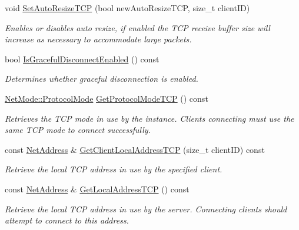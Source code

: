 \begin{DoxyCompactItemize}
void \hyperlink{class_net_instance_server_aff5d113ed49b9260903d50d832ea62dd}{SetAutoResizeTCP} (bool newAutoResizeTCP, size\_\-t clientID)
\begin{DoxyCompactList}\small\item\em Enables or disables auto resize, if enabled the TCP receive buffer size will increase as necessary to accommodate large packets. \item\end{DoxyCompactList}\item 
bool \hyperlink{class_net_instance_server_ad96584152bac1eae1103a98f90556fa4}{IsGracefulDisconnectEnabled} () const 
\begin{DoxyCompactList}\small\item\em Determines whether graceful disconnection is enabled. \item\end{DoxyCompactList}\item 
\hyperlink{class_net_mode_a43cfa55ee6a4db66a8d7d6c27f766964}{NetMode::ProtocolMode} \hyperlink{class_net_instance_server_a545676597d34fabc02a6d896d9c69d3d}{GetProtocolModeTCP} () const 
\begin{DoxyCompactList}\small\item\em Retrieves the TCP mode in use by the instance. Clients connecting must use the same TCP mode to connect successfully. \item\end{DoxyCompactList}\item 
const \hyperlink{class_net_address}{NetAddress} \& \hyperlink{class_net_instance_server_a360d85df2f48ca7964816bc95ed9ad98}{GetClientLocalAddressTCP} (size\_\-t clientID) const 
\begin{DoxyCompactList}\small\item\em Retrieve the local TCP address in use by the specified client. \item\end{DoxyCompactList}\item 
const \hyperlink{class_net_address}{NetAddress} \& \hyperlink{class_net_instance_server_ae1b6038671d198ce1f26da38661c397f}{GetLocalAddressTCP} () const 
\begin{DoxyCompactList}\small\item\em Retrieve the local TCP address in use by the server. Connecting clients should attempt to connect to this address. \item\end{DoxyCompactList}\item 

\end{DoxyCompactItemize}
